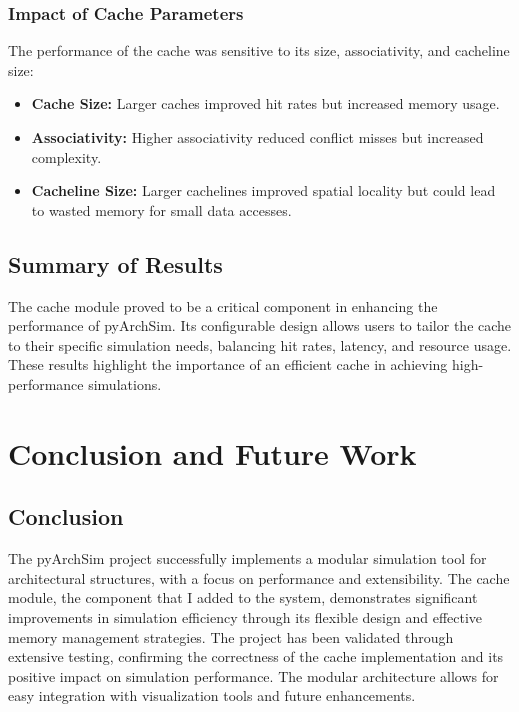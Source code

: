 \documentclass[12pt,a4paper]{report}
\begin{document}
\subsubsection{Impact of Cache Parameters}
The performance of the cache was sensitive to its size, associativity, and cacheline size:
\begin{itemize}
  \item \textbf{Cache Size:} Larger caches improved hit rates but increased memory usage.
  \item \textbf{Associativity:} Higher associativity reduced conflict misses but increased complexity.
  \item \textbf{Cacheline Size:} Larger cachelines improved spatial locality but could lead to wasted memory for small data accesses.
\end{itemize}

\subsection{Summary of Results}
The cache module proved to be a critical component in enhancing the performance of pyArchSim. Its configurable design allows users to tailor the cache to their specific simulation needs, balancing hit rates, latency, and resource usage. These results highlight the importance of an efficient cache in achieving high-performance simulations.


\section{Conclusion and Future Work}
\subsection{Conclusion}
The pyArchSim project successfully implements a modular simulation tool for architectural structures, with a focus on performance and extensibility. The cache module, the component that I added to the system, demonstrates significant improvements in simulation efficiency through its flexible design and effective memory management strategies.
The project has been validated through extensive testing, confirming the correctness of the cache implementation and its positive impact on simulation performance. The modular architecture allows for easy integration with visualization tools and future enhancements.
\end{document}
